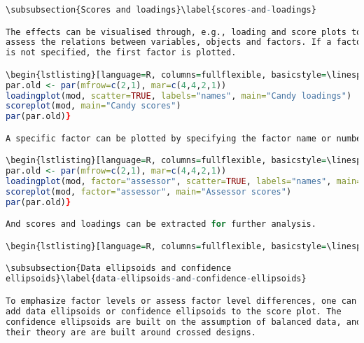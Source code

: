 \begin{lstlisting}[language=R, columns=fullflexible, basicstyle=\linespread{0.85}\small\ttfamily, stringstyle=\color{DarkGreen}, keywordstyle=\color{blue}, commentstyle=\color{DarkGreen},]
\subsubsection{Scores and loadings}\label{scores-and-loadings}

The effects can be visualised through, e.g., loading and score plots to
assess the relations between variables, objects and factors. If a factor
is not specified, the first factor is plotted.

\begin{lstlisting}[language=R, columns=fullflexible, basicstyle=\linespread{0.85}\small\ttfamily, stringstyle=\color{DarkGreen}, keywordstyle=\color{blue}, commentstyle=\color{DarkGreen},]
par.old <- par(mfrow=c(2,1), mar=c(4,4,2,1))
loadingplot(mod, scatter=TRUE, labels="names", main="Candy loadings")
scoreplot(mod, main="Candy scores")
par(par.old)}

A specific factor can be plotted by specifying the factor name or number

\begin{lstlisting}[language=R, columns=fullflexible, basicstyle=\linespread{0.85}\small\ttfamily, stringstyle=\color{DarkGreen}, keywordstyle=\color{blue}, commentstyle=\color{DarkGreen},]
par.old <- par(mfrow=c(2,1), mar=c(4,4,2,1))
loadingplot(mod, factor="assessor", scatter=TRUE, labels="names", main="Assessor loadings")
scoreplot(mod, factor="assessor", main="Assessor scores")
par(par.old)}

And scores and loadings can be extracted for further analysis.

\begin{lstlisting}[language=R, columns=fullflexible, basicstyle=\linespread{0.85}\small\ttfamily, stringstyle=\color{DarkGreen}, keywordstyle=\color{blue}, commentstyle=\color{DarkGreen},]L\ <-\ loadings(mod,\ factor="candy")\ head(L)\ S\ <-\ scores(mod,\ factor="candy")\ head(S)}

\subsubsection{Data ellipsoids and confidence
ellipsoids}\label{data-ellipsoids-and-confidence-ellipsoids}

To emphasize factor levels or assess factor level differences, one can
add data ellipsoids or confidence ellipsoids to the score plot. The
confidence ellipsoids are built on the assumption of balanced data, and
their theory are are built around crossed designs.


\end{lstlisting}
